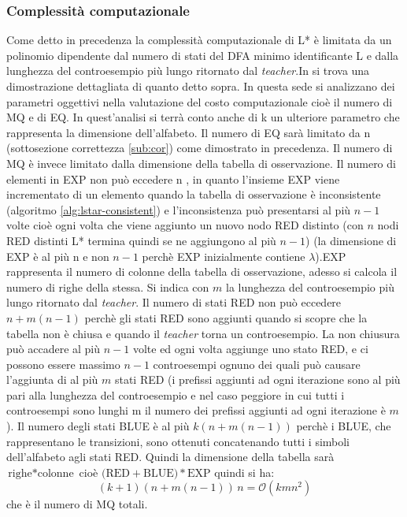 \subsubsection{Complessità computazionale}\label{subsub:comcom}Come detto in precedenza la complessità computazionale di L* è limitata da un polinomio dipendente dal numero di stati del DFA minimo identificante \ac{L} e dalla lunghezza del controesempio più lungo ritornato dal \textit{teacher}.In \cite{Angluin87} si trova una dimostrazione dettagliata di quanto detto sopra. In questa sede si analizzano dei parametri oggettivi nella valutazione del costo computazionale cioè il numero di \ac{MQ} e di \ac{EQ}. In quest'analisi si terrà conto anche di k un ulteriore parametro che rappresenta la dimensione dell'alfabeto. Il numero di \ac{EQ} sarà limitato da n (sottosezione correttezza \ref{sub:cor}) come dimostrato in precedenza. Il numero di \ac{MQ} è invece limitato dalla dimensione della tabella di osservazione. Il numero di elementi in EXP non può eccedere n , in quanto l'insieme EXP viene incrementato di un elemento quando la tabella di osservazione è inconsistente (algoritmo \ref{alg:lstar-consistent}) e l'inconsistenza può presentarsi al più $n-1$ volte cioè ogni volta che viene aggiunto un nuovo nodo RED distinto (con $n$ nodi RED distinti L* termina quindi se ne aggiungono al più $n-1$) (la dimensione di EXP è al più n e non $n-1$ perchè EXP inizialmente contiene $\lambda$).EXP rappresenta il numero di colonne della tabella di osservazione, adesso si calcola il numero di righe della stessa. Si indica con $m$ la lunghezza del controesempio più lungo ritornato dal \textit{teacher}. Il numero di stati RED non può eccedere $n+m(n-1)$  perchè gli stati RED sono aggiunti quando si scopre che la tabella non è chiusa e quando il \textit{teacher} torna un controesempio.  La non chiusura può accadere al più $n-1$ volte ed ogni volta aggiunge uno stato RED, e ci possono essere massimo $n-1$ controesempi ognuno dei quali può causare l'aggiunta di al più $m$ stati RED (i prefissi aggiunti ad ogni iterazione sono al più pari alla lunghezza del controesempio e nel caso peggiore in cui tutti i controesempi sono lunghi m il numero dei prefissi aggiunti ad ogni iterazione è $m$). Il numero degli stati BLUE è al più $k(n+m(n-1))$ perchè i BLUE, che rappresentano le transizioni, sono ottenuti concatenando tutti i simboli dell'alfabeto agli stati RED. Quindi la dimensione della tabella sarà $\text{righe} * \text{colonne}$ cioè $\text{(RED}+\text{BLUE)}*\text{EXP}$ quindi si ha:
\begin{equation*}
(k+1)(n+m(n-1))\,n = \mathcal{O}(kmn^{2})
\end{equation*}
che è il numero di \ac{MQ} totali.
